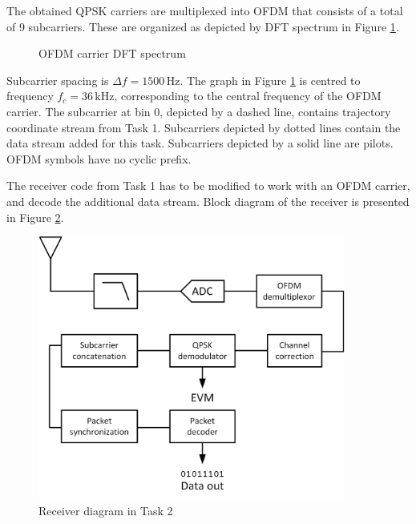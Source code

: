 \documentclass{article}
\begin{document}
The obtained QPSK carriers are multiplexed into OFDM that consists of a total of 9 subcarriers. These are organized as depicted by DFT spectrum in Figure \ref{fig:dft}.
\begin{figure}[h!]
	\centering
	\caption{OFDM carrier DFT spectrum}
	\label{fig:dft}
\end{figure}

Subcarrier spacing is $\varDelta f = 1500 \,\textrm{Hz}$. The graph in Figure \ref{fig:dft} is centred to frequency $f_c = 36 \,\textrm{kHz}$, corresponding to the central frequency of the OFDM carrier. The subcarrier at bin 0, depicted by a dashed line, contains trajectory coordinate stream from Task 1. Subcarriers depicted by dotted lines contain the data stream added for this task. Subcarriers depicted by a solid line are pilots. OFDM symbols have no cyclic prefix.

The receiver code from Task 1 has to be modified to work with an OFDM carrier, and decode the additional data stream. Block diagram of the receiver is presented in Figure \ref{fig:task2}.

\begin{figure}[h!]
\centering
\includegraphics[width=0.9\textwidth]{Images/Task2.png}
\caption{Receiver diagram in Task 2}
\label{fig:task2}
\end{figure}
\end{document}
